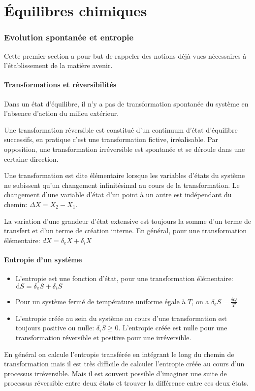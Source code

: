 \part{Équilibres chimiques}
\section{Evolution spontanée et entropie}
Cette premier section a pour but de rappeler des notions déjà vues nécessaires
à l'établissement de la matière avenir.

\subsection{Transformations et réversibilités}
Dans un état d'équilibre, il n'y a pas de transformation spontanée du système
en l'absence d'action du milieu extérieur.

Une transformation réversible est constitué d'un continuum d'état d'équilibre
successifs, en pratique c'est une transformation fictive, irréalisable.
Par opposition, une transformation irréversible est spontanée et
se déroule dans une certaine direction.

Une transformation est dite élémentaire lorsque les variables d'états
du système ne subissent qu'un changement infinitésimal
au cours de la transformation.
Le changement d'une variable d'état d'un point à un autre est
indépendant du chemin: $\Delta X = X_2 - X_1$.

La variation d'une grandeur d'état extensive est toujours
la somme d'un terme de transfert et d'un terme de création interne.
En général, pour une transformation élémentaire: $dX = \delta_eX+\delta_iX$
\subsection{Entropie d'un système}
\begin{itemize}
  \item L'entropie est une fonction d'état, pour une transformation élémentaire:
    $\operatorname{d}\! S = \delta_eS+\delta_iS$
  \item Pour un système fermé de température uniforme égale à $T$,
    on a $\delta_eS = \frac {\delta Q}T$
  \item L'entropie créée au sein du système au cours d'une transformation est
    toujours positive ou nulle: $\delta_iS \geqslant 0$.
    L'entropie créée est nulle pour une transformation réversible et
    positive pour une irréversible.
\end{itemize}
En général on calcule l'entropie transférée en intégrant
le long du chemin de transformation mais il est très difficile de
calculer l'entropie créée au cours d'un processus irréversible.
Mais il est souvent possible d'imaginer une suite de processus réversible
entre deux états et trouver la différence entre ces deux états.

